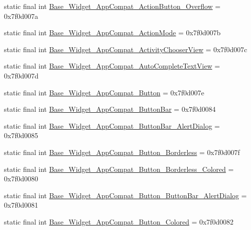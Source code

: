 \begin{DoxyCompactItemize}
\item 
static final int \mbox{\hyperlink{classandroid_1_1support_1_1design_1_1R_1_1style_ac6620c5c97b037d4dd21cca350cea322}{Base\+\_\+\+Widget\+\_\+\+App\+Compat\+\_\+\+Action\+Button\+\_\+\+Overflow}} = 0x7f0d007a
\item 
static final int \mbox{\hyperlink{classandroid_1_1support_1_1design_1_1R_1_1style_afadec33a3b80d10805dd65b0600a194b}{Base\+\_\+\+Widget\+\_\+\+App\+Compat\+\_\+\+Action\+Mode}} = 0x7f0d007b
\item 
static final int \mbox{\hyperlink{classandroid_1_1support_1_1design_1_1R_1_1style_a1453879def50220f41b8becea7ed382b}{Base\+\_\+\+Widget\+\_\+\+App\+Compat\+\_\+\+Activity\+Chooser\+View}} = 0x7f0d007c
\item 
static final int \mbox{\hyperlink{classandroid_1_1support_1_1design_1_1R_1_1style_a9858e7079d9ba63620d2767358539c57}{Base\+\_\+\+Widget\+\_\+\+App\+Compat\+\_\+\+Auto\+Complete\+Text\+View}} = 0x7f0d007d
\item 
static final int \mbox{\hyperlink{classandroid_1_1support_1_1design_1_1R_1_1style_aed1321016b20d3d28dcc091269449221}{Base\+\_\+\+Widget\+\_\+\+App\+Compat\+\_\+\+Button}} = 0x7f0d007e
\item 
static final int \mbox{\hyperlink{classandroid_1_1support_1_1design_1_1R_1_1style_ae2f98036d7d39887e218051130a6451b}{Base\+\_\+\+Widget\+\_\+\+App\+Compat\+\_\+\+Button\+Bar}} = 0x7f0d0084
\item 
static final int \mbox{\hyperlink{classandroid_1_1support_1_1design_1_1R_1_1style_a683c70b9226720a79c12a2be03fb2858}{Base\+\_\+\+Widget\+\_\+\+App\+Compat\+\_\+\+Button\+Bar\+\_\+\+Alert\+Dialog}} = 0x7f0d0085
\item 
static final int \mbox{\hyperlink{classandroid_1_1support_1_1design_1_1R_1_1style_aa9a41e0b3b102853a8a329a7fe7e322a}{Base\+\_\+\+Widget\+\_\+\+App\+Compat\+\_\+\+Button\+\_\+\+Borderless}} = 0x7f0d007f
\item 
static final int \mbox{\hyperlink{classandroid_1_1support_1_1design_1_1R_1_1style_a492ab5e68241a223be03eb05c7c0a394}{Base\+\_\+\+Widget\+\_\+\+App\+Compat\+\_\+\+Button\+\_\+\+Borderless\+\_\+\+Colored}} = 0x7f0d0080
\item 
static final int \mbox{\hyperlink{classandroid_1_1support_1_1design_1_1R_1_1style_a741cde0e312b8362ca9dfc60e04349c9}{Base\+\_\+\+Widget\+\_\+\+App\+Compat\+\_\+\+Button\+\_\+\+Button\+Bar\+\_\+\+Alert\+Dialog}} = 0x7f0d0081
\item 
static final int \mbox{\hyperlink{classandroid_1_1support_1_1design_1_1R_1_1style_ad08fe86bdef40d5490165e9498049f1e}{Base\+\_\+\+Widget\+\_\+\+App\+Compat\+\_\+\+Button\+\_\+\+Colored}} = 0x7f0d0082

\end{DoxyCompactItemize}
